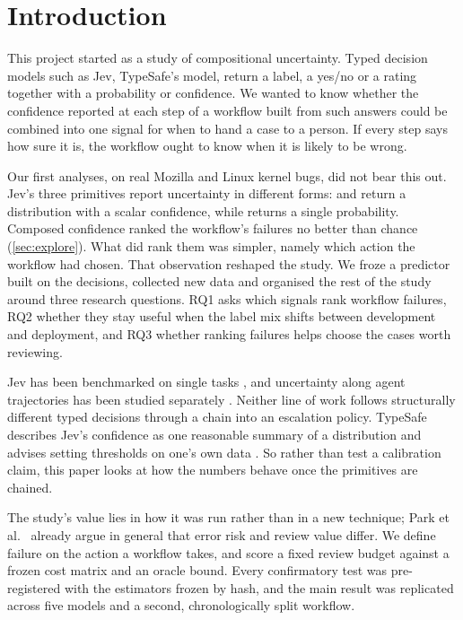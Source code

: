 \section{Introduction}

This project started as a study of compositional uncertainty. Typed
decision models such as Jev, TypeSafe's model, return a label, a yes/no
or a rating together with a probability or confidence. We wanted to know
whether the confidence reported at each step of a workflow built from
such answers could be combined into one signal for when to hand a case
to a person. If every step says how sure it is, the workflow ought to
know when it is likely to be wrong.

Our first analyses, on real Mozilla and Linux kernel bugs, did not bear
this out. Jev's three primitives report uncertainty in different forms:
\choice{} and \score{} return a distribution with a scalar confidence,
while \noul{} returns a single probability. Composed confidence ranked
the workflow's failures no better than chance (\cref{sec:explore}). What
did rank them was simpler, namely which action the workflow had chosen.
That observation reshaped the study. We froze a predictor built on the
decisions, collected new data and organised the rest of the study around three research questions. RQ1
asks which signals rank workflow failures, RQ2 whether they stay useful
when the label mix shifts between development and deployment, and RQ3
whether ranking failures helps choose the cases worth reviewing.

Jev has been benchmarked on single tasks
\citep{deusser2026jev,meng2026jevaudit,denney2026jev}, and uncertainty
along agent trajectories has been studied separately
\citep{lin2026uqagents}. Neither line of work follows structurally
different typed decisions through a chain into an escalation policy.
TypeSafe describes Jev's confidence as one reasonable summary of a
distribution and advises setting thresholds on one's own data
\citep{typesafe2026confidence}. So rather than test a calibration claim,
this paper looks at how the numbers behave once the primitives are
chained.

The study's value lies in how it was run rather than in a new technique;
Park et al.\ \citep{park2026riskreview} already argue in general that
error risk and review value differ. We define failure on the action a workflow takes, and score a fixed
review budget against a frozen cost matrix and an oracle bound. Every
confirmatory test was pre-registered with the estimators frozen by hash,
and the main result was replicated across five models and a second,
chronologically split workflow.

